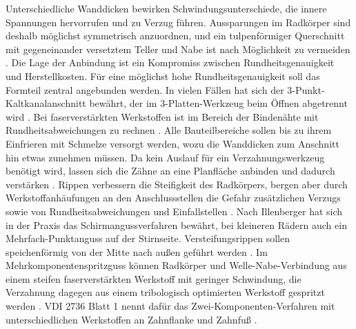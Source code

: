 Unterschiedliche Wanddicken bewirken Schwindungsunterschiede, die innere Spannungen hervorrufen und zu Verzug führen. Aussparungen im Radkörper sind deshalb möglichst symmetrisch anzuordnen, und ein tulpenförmiger Querschnitt mit gegeneinander versetztem Teller und Nabe ist nach Möglichkeit zu vermeiden \cite[S.~37 f.]{VDI2736-1}. Die Lage der Anbindung ist ein Kompromiss zwischen Rundheitsgenauigkeit und Herstellkosten. Für eine möglichst hohe Rundheitsgenauigkeit soll das Formteil zentral angebunden werden. In vielen Fällen hat sich der 3-Punkt-Kaltkanalanschnitt bewährt, der im 3-Platten-Werkzeug beim Öffnen abgetrennt wird \cite[S.~38]{VDI2736-1}. Bei faserverstärkten Werkstoffen ist im Bereich der Bindenähte mit Rundheitsabweichungen zu rechnen \cite[S.~38]{VDI2736-1}. Alle Bauteilbereiche sollen bis zu ihrem Einfrieren mit Schmelze versorgt werden, wozu die Wanddicken zum Anschnitt hin etwas zunehmen müssen. Da kein Auslauf für ein Verzahnungswerkzeug benötigt wird, lassen sich die Zähne an eine Planfläche anbinden und dadurch verstärken \cite[S.~38]{VDI2736-1}. Rippen verbessern die Steifigkeit des Radkörpers, bergen aber durch Werkstoffanhäufungen an den Anschlussstellen die Gefahr zusätzlichen Verzugs sowie von Rundheitsabweichungen und Einfallstellen \cite[S.~39]{VDI2736-1}. Nach Illenberger hat sich in der Praxis das Schirmangussverfahren bewährt, bei kleineren Rädern auch ein Mehrfach-Punktanguss auf der Stirnseite. Versteifungsrippen sollen speichenförmig von der Mitte nach außen geführt werden \cite[S.~5 f.]{Ill22}. Im Mehrkomponentenspritzguss können Radkörper und Welle-Nabe-Verbindung aus einem steifen faserverstärkten Werkstoff mit geringer Schwindung, die Verzahnung dagegen aus einem tribologisch optimierten Werkstoff gespritzt werden \cite[S.~6]{Ill22}. VDI 2736 Blatt 1 nennt dafür das Zwei-Komponenten-Verfahren mit unterschiedlichen Werkstoffen an Zahnflanke und Zahnfuß \cite[S.~14]{VDI2736-1}.

